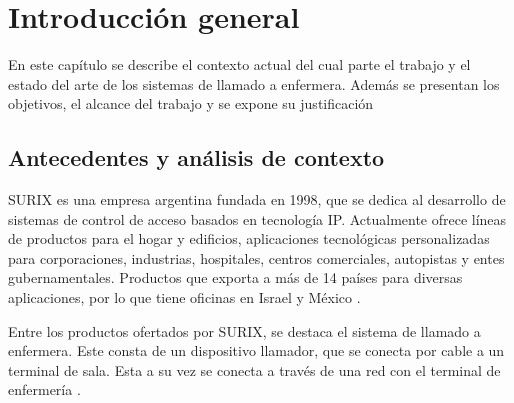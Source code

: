
\chapter{Introducción general} %

\label{Chapter1} %

En este capítulo se describe el contexto actual del cual parte el trabajo y el estado del arte de los sistemas de llamado a enfermera. Además se presentan los objetivos, el alcance del trabajo y se expone su justificación

\label{IntroGeneral}


\newcommand{\keyword}[1]{\textbf{#1}}
\newcommand{\tabhead}[1]{\textbf{#1}}
\newcommand{\code}[1]{\texttt{#1}}
\newcommand{\file}[1]{\texttt{\bfseries#1}}
\newcommand{\option}[1]{\texttt{\itshape#1}}
\newcommand{\grados}{$^{\circ}$}



\section{Antecedentes y análisis de contexto}

SURIX es una empresa argentina fundada en 1998, que se dedica al desarrollo de sistemas de control de acceso basados en tecnología IP. Actualmente ofrece líneas de productos para el hogar y edificios, aplicaciones tecnológicas personalizadas para corporaciones, industrias, hospitales, centros comerciales, autopistas y entes gubernamentales. Productos que exporta a más de 14 países para diversas aplicaciones, por lo que tiene oficinas en Israel y México \cite{surix}.

Entre los productos ofertados por SURIX, se destaca el sistema de llamado a enfermera. Este consta de un dispositivo llamador, que se conecta por cable a un terminal de sala. Esta a su vez se conecta a través de una red con el terminal de enfermería \cite{helpip}.

